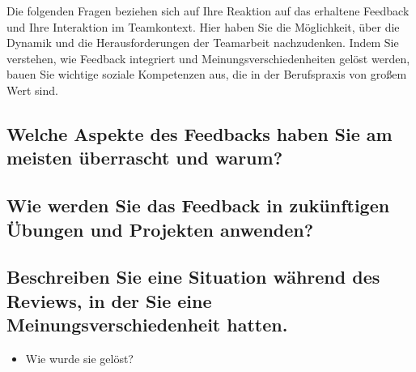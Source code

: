 \documentclass[a4paper,11pt]{article}
\begin{document}
Die folgenden Fragen beziehen sich auf Ihre Reaktion auf das erhaltene Feedback und Ihre Interaktion im Teamkontext. Hier haben Sie die Möglichkeit, über die Dynamik und die Herausforderungen der Teamarbeit nachzudenken. Indem Sie verstehen, wie Feedback integriert und Meinungsverschiedenheiten gelöst werden, bauen Sie wichtige soziale Kompetenzen aus, die in der Berufspraxis von großem Wert sind.

\subsection*{Welche Aspekte des Feedbacks haben Sie am meisten überrascht und warum?}

\subsection*{Wie werden Sie das Feedback in zukünftigen Übungen und Projekten anwenden?}

\subsection*{Beschreiben Sie eine Situation während des Reviews, in der Sie eine Meinungsverschiedenheit hatten.}
\begin{itemize}
    \item Wie wurde sie gelöst?
\end{itemize}
\end{document}
